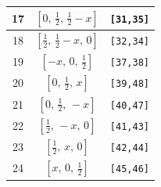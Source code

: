 \documentclass[fleqn,8pt]{jsarticle}
\begin{document}
\begin{longtable}{ccc}
17 & $\left[ 0,\, \frac{1}{2},\, \frac{1}{2} - x \right]$ & {\tt [31,35]} \\ \hline
18 & $\left[ \frac{1}{2},\, \frac{1}{2} - x,\, 0 \right]$ & {\tt [32,34]} \\ \hline
19 & $\left[ - x,\, 0,\, \frac{1}{2} \right]$ & {\tt [37,38]} \\ \hline
20 & $\left[ 0,\, \frac{1}{2},\, x \right]$ & {\tt [39,48]} \\ \hline
21 & $\left[ 0,\, \frac{1}{2},\, - x \right]$ & {\tt [40,47]} \\ \hline
22 & $\left[ \frac{1}{2},\, - x,\, 0 \right]$ & {\tt [41,43]} \\ \hline
23 & $\left[ \frac{1}{2},\, x,\, 0 \right]$ & {\tt [42,44]} \\ \hline
24 & $\left[ x,\, 0,\, \frac{1}{2} \right]$ & {\tt [45,46]} \\
\end{longtable}
\renewcommand{\arraystretch}{1.2}
\end{document}
